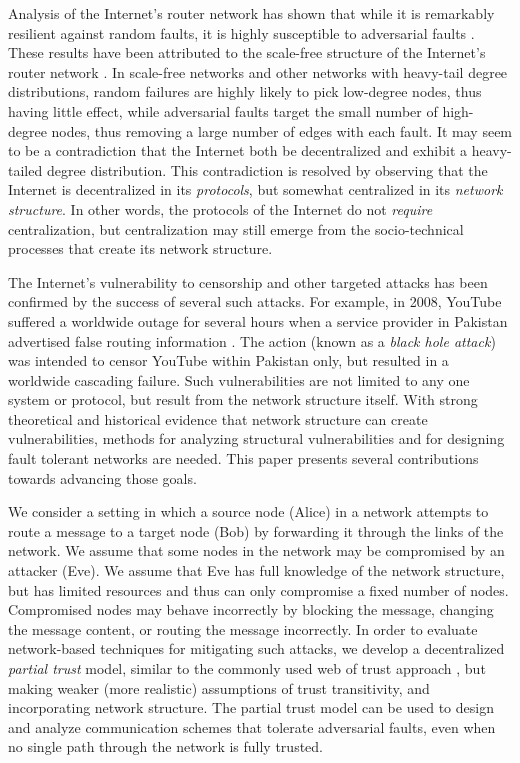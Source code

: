 \documentclass{sig-alternate-05-2015}
\begin{document}
Analysis of the Internet's router network has shown that while it is remarkably
resilient against random faults,
it is highly susceptible to adversarial faults \cite{albert_error_2000}.
These results have been attributed to the scale-free structure of the Internet's
router network
\cite{barabasi_emergence_1999,barabasi_scale-free_2009}.
In scale-free networks and other networks with heavy-tail degree distributions,
random failures are highly likely to pick low-degree nodes, thus having
little effect,
while adversarial faults target the small number of high-degree nodes,
thus removing a large number of edges with each fault.
It may seem to be a contradiction that the Internet both be decentralized
and exhibit a heavy-tailed degree distribution.
This contradiction is resolved by observing that the Internet is decentralized
in its {\em protocols}, but somewhat centralized in its {\em network structure}.
In other words, the protocols of the Internet do not {\em require}
centralization, but centralization may still emerge from the socio-technical
processes that create its network structure.

The Internet's vulnerability to censorship and other targeted attacks
has been confirmed by the success of several such attacks.
For example, in 2008, YouTube suffered a worldwide outage for several hours
when a service provider in Pakistan advertised false routing information
\cite{hunter_pakistan_2008}.
The action (known as a {\em black hole attack}) was intended to censor YouTube
within Pakistan only, but resulted in a worldwide cascading failure.
Such vulnerabilities are not limited to any one system or protocol,
but result from the network structure itself.
With strong theoretical and historical evidence that network structure
can create vulnerabilities,
methods for analyzing structural vulnerabilities and for designing
fault tolerant networks are needed.
This paper presents several contributions towards advancing those goals.

We consider a setting in which a source node (Alice)
in a network attempts to route a message
to a target node (Bob) by forwarding it through the links of the network.
We assume that some nodes in the network may be compromised by an attacker
(Eve).
We assume that Eve has full knowledge of the network structure, but has
limited resources and thus can only compromise a fixed number of nodes.
Compromised nodes may behave incorrectly by blocking the message,
changing the message content, or routing the message incorrectly.
In order to evaluate network-based techniques for mitigating such attacks,
we develop a decentralized {\em partial trust} model,
similar to the commonly used web of trust approach
\cite{zimmermann_official_1995,ferguson_practical_2003},
but making weaker (more realistic) assumptions of trust transitivity,
and incorporating network structure.
The partial trust model can be used to design and analyze communication
schemes that tolerate adversarial faults,
even when no single path through the network is fully trusted.
\end{document}
